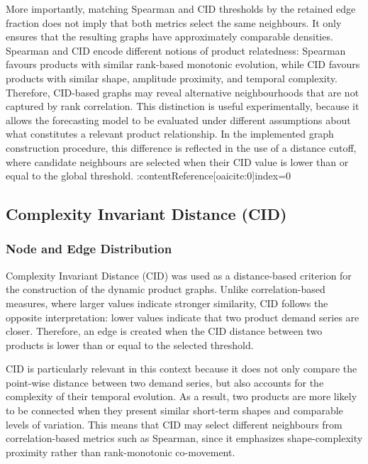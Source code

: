 More importantly, matching Spearman and CID thresholds by the retained edge fraction does not imply that both metrics select the same neighbours. It only ensures that the resulting graphs have approximately comparable densities. Spearman and CID encode different notions of product relatedness: Spearman favours products with similar rank-based monotonic evolution, while CID favours products with similar shape, amplitude proximity, and temporal complexity. Therefore, CID-based graphs may reveal alternative neighbourhoods that are not captured by rank correlation. This distinction is useful experimentally, because it allows the forecasting model to be evaluated under different assumptions about what constitutes a relevant product relationship. In the implemented graph construction procedure, this difference is reflected in the use of a distance cutoff, where candidate neighbours are selected when their CID value is lower than or equal to the global threshold. :contentReference[oaicite:0]{index=0}
\subsection{Complexity Invariant Distance (CID)}
\label{subsec:cid_graphs}

\subsubsection{Node and Edge Distribution}
\label{subsubsec:cid_node_edge_distribution}

Complexity Invariant Distance (CID) was used as a distance-based criterion for the construction of the dynamic product graphs. Unlike correlation-based measures, where larger values indicate stronger similarity, CID follows the opposite interpretation: lower values indicate that two product demand series are closer. Therefore, an edge is created when the CID distance between two products is lower than or equal to the selected threshold.

CID is particularly relevant in this context because it does not only compare the point-wise distance between two demand series, but also accounts for the complexity of their temporal evolution. As a result, two products are more likely to be connected when they present similar short-term shapes and comparable levels of variation. This means that CID may select different neighbours from correlation-based metrics such as Spearman, since it emphasizes shape-complexity proximity rather than rank-monotonic co-movement.

